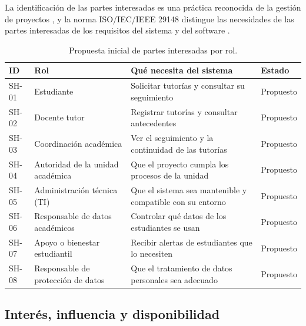\documentclass[11pt,a4paper]{article}
\begin{document}
La identificación de las partes interesadas es una práctica
reconocida de la gestión de proyectos \cite{pmbok2021},
y la norma ISO/IEC/IEEE 29148 distingue las necesidades
de las partes interesadas de los requisitos del sistema
y del software \cite{iso29148}.

\begin{table}[htbp]
\centering
\small
\caption{Propuesta inicial de partes interesadas por rol.}
\label{tab:stakeholders}

\begin{tabularx}{\textwidth}{
    |l
    |>{\raggedright\arraybackslash}X
    |>{\raggedright\arraybackslash}X
    |l|
}
\hline
\textbf{ID} &
\textbf{Rol} &
\textbf{Qué necesita del sistema} &
\textbf{Estado} \\
\hline

SH-01 & Estudiante &
Solicitar tutorías y consultar su seguimiento &
Propuesto \\
\hline

SH-02 & Docente tutor &
Registrar tutorías y consultar antecedentes &
Propuesto \\
\hline

SH-03 & Coordinación académica &
Ver el seguimiento y la continuidad de las tutorías &
Propuesto \\
\hline

SH-04 & Autoridad de la unidad académica &
Que el proyecto cumpla los procesos de la unidad &
Propuesto \\
\hline

SH-05 & Administración técnica (TI) &
Que el sistema sea mantenible y compatible con su entorno &
Propuesto \\
\hline

SH-06 & Responsable de datos académicos &
Controlar qué datos de los estudiantes se usan &
Propuesto \\
\hline

SH-07 & Apoyo o bienestar estudiantil &
Recibir alertas de estudiantes que lo necesiten &
Propuesto \\
\hline

SH-08 & Responsable de protección de datos &
Que el tratamiento de datos personales sea adecuado &
Propuesto \\
\hline

\end{tabularx}
\end{table}


\subsection{Interés, influencia y disponibilidad}
\end{document}
